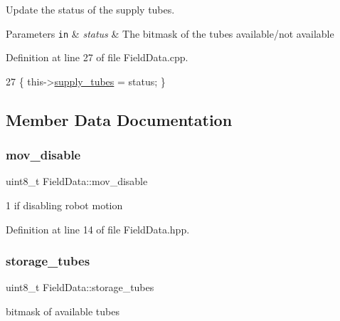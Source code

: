 Update the status of the supply tubes. 


\begin{DoxyParams}[1]{Parameters}
\mbox{\tt in}  & {\em status} & The bitmask of the tubes available/not available \\
\hline
\end{DoxyParams}


Definition at line 27 of file Field\+Data.\+cpp.


\begin{DoxyCode}
27 \{ this->\hyperlink{class_field_data_a2ac91dcec791870370d578c276993690}{supply\_tubes} = status; \}
\end{DoxyCode}


\subsection{Member Data Documentation}
\mbox{\label{class_field_data_a82ed3c6771df262aae42cb332ccc7d0c}} 
\subsubsection{\texorpdfstring{mov\+\_\+disable}{mov\_disable}}
{\footnotesize\ttfamily uint8\+\_\+t Field\+Data\+::mov\+\_\+disable\hspace{0.3cm}{\ttfamily [private]}}



1 if disabling robot motion 



Definition at line 14 of file Field\+Data.\+hpp.

\mbox{\label{class_field_data_a215428022f049a8f0b6702783291b636}} 
\subsubsection{\texorpdfstring{storage\+\_\+tubes}{storage\_tubes}}
{\footnotesize\ttfamily uint8\+\_\+t Field\+Data\+::storage\+\_\+tubes\hspace{0.3cm}{\ttfamily [private]}}



bitmask of available tubes 



